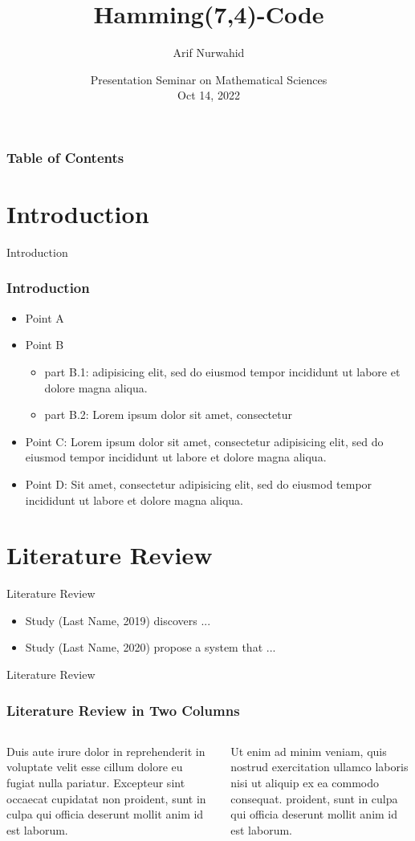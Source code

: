 \documentclass[10pt]{beamer}
\title[Hamming(7,4)-Code]{Hamming(7,4)-Code}
\author[Arif Nurwahid]{Arif Nurwahid\inst{1}}%
\institute[Ehime University]{Graduate School of Science and Engineering, Ehime University\inst{1}}
\date[\textcolor{ehimeColor2}{Mathematical Science, 2022}]
{Presentation Seminar on Mathematical Sciences\\
Oct 14, 2022}
\begin{document}
\frame{\titlepage}
\begin{frame}
\frametitle{Table of Contents}
\tableofcontents
\end{frame}

\section{Introduction}
    \begin{frame}{Introduction}
    \frametitle{Introduction}
        \begin{itemize}
            \item Point A
            \item Point B
        \begin{itemize}
            \item part B.1: adipisicing elit, sed do eiusmod tempor incididunt ut labore et dolore magna aliqua.
            \item part B.2: Lorem ipsum dolor sit amet, consectetur 
        \end{itemize}
            \item Point C: Lorem ipsum dolor sit amet, consectetur adipisicing elit, sed do eiusmod tempor incididunt ut labore et dolore magna aliqua.
            \item Point D: Sit amet, consectetur adipisicing elit, sed do eiusmod tempor incididunt ut labore et dolore magna aliqua.
        \end{itemize}
    \end{frame}
\section{Literature Review}

\begin{frame}{Literature Review}
    
	
    \begin{itemize}
        \item  Study (Last Name, 2019) discovers ...
        \item  Study (Last Name, 2020) propose a system that ...
    \end{itemize}
\end{frame}

\begin{frame}{Literature Review}
    \frametitle{Literature Review in Two Columns}
    \begin{columns}
    
    Duis aute irure dolor in reprehenderit in voluptate velit esse cillum dolore eu fugiat nulla pariatur. Excepteur sint occaecat cupidatat non proident, sunt in culpa qui officia deserunt mollit anim id est laborum.
    
    Ut enim ad minim veniam, quis nostrud exercitation ullamco laboris nisi ut aliquip ex ea commodo consequat. proident, sunt in culpa qui officia deserunt mollit anim id est laborum.
    
    \end{columns}
\end{frame}
\end{document}
